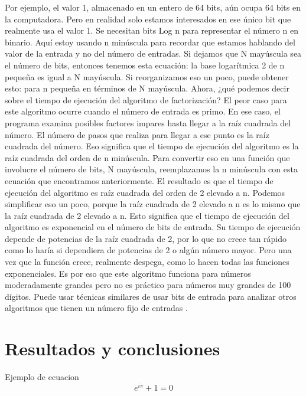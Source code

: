 \documentclass{article}
\begin{document}
Por ejemplo, el valor 1, almacenado en un entero de 64
bits, aún ocupa 64 bits en la computadora. Pero en realidad solo estamos
interesados en ese único bit que realmente usa el valor 1. Se necesitan bits
Log n para representar el número n en binario. Aquí estoy usando n minúscula
para recordar que estamos hablando del valor de la entrada y no del número de
entradas. Si dejamos que N mayúscula sea el número de bits, entonces tenemos
esta ecuación: la base logarítmica 2 de n pequeña es igual a N mayúscula. Si
reorganizamos eso un poco, puede obtener esto: para n pequeña en términos de N
mayúscula. Ahora, ¿qué podemos decir sobre el tiempo de ejecución del algoritmo
de factorización? El peor caso para este algoritmo ocurre cuando el número de
entrada es primo. En ese caso, el programa examina posibles factores impares
hasta llegar a la raíz cuadrada del número. El número de pasos que realiza para
llegar a ese punto es la raíz cuadrada del número. Eso significa que el tiempo
de ejecución del algoritmo es la raíz cuadrada del orden de n minúscula. Para
convertir eso en una función que involucre el número de bits, N mayúscula,
reemplazamos la n minúscula con esta ecuación que encontramos anteriormente. El
resultado es que el tiempo de ejecución del algoritmo es raíz cuadrada del orden
de 2 elevado a n. Podemos simplificar eso un poco, porque la raíz cuadrada de 2
elevado a n es lo mismo que la raíz cuadrada de 2 elevado a n. Esto significa
que el tiempo de ejecución del algoritmo es exponencial en el número de bits de
entrada. Su tiempo de ejecución depende de potencias de la raíz cuadrada de 2,
por lo que no crece tan rápido como lo haría si dependiera de potencias de 2 o
algún número mayor. Pero una vez que la función crece, realmente despega, como
lo hacen todas las funciones exponenciales. Es por eso que este algoritmo
funciona para números moderadamente grandes pero no es práctico para números muy
grandes de 100 dígitos. Puede usar técnicas similares de usar bits de entrada
para analizar otros algoritmos que tienen un número fijo de entradas \cite{stephens2015learning}.

\section{Resultados y conclusiones}
 
 
 
    

 


Ejemplo de ecuacion
$$ e^{i\pi} + 1 = 0 $$
\end{document}
